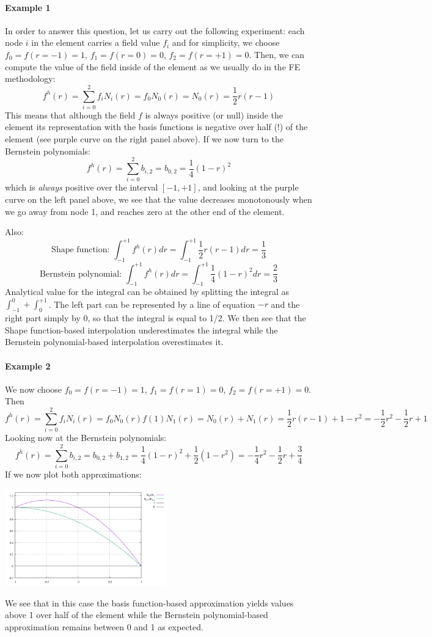 \paragraph{Example 1}
In order to answer this question, let us carry out the following 
experiment: each node $i$ in the element carries a field value $f_i$ and for simplicity, 
we choose $f_0=f(r=-1)=1$, $f_1=f(r=0)=0$, $f_2=f(r=+1)=0$.
Then, we can compute the value of the field inside of the element 
as we usually do in the FE methodology:
\[
f^h(r) = \sum_{i=0}^2 f_i N_i(r) = f_0 N_0(r) = N_0(r) = \frac{1}{2}r(r-1)
\]
This means that although the field $f$ is always positive (or null) inside the element
its representation with the basis functions is negative over half (!) of the element
(see purple curve on the right panel above).
If we now turn to the Bernstein polynomials:
\[
f^h(r) = \sum_{i=0}^2 b_{i,2} = b_{0,2} = \frac{1}{4}(1-r)^2
\]
which is {\it always} positive over the interval $[-1,+1]$, 
and looking at the purple curve on the left panel above, 
we see that the value decreases monotonously when we go away from node 1, and reaches 
zero at the other end of the element. 

Also:
\[
\text{Shape function: } \int_{-1}^{+1} f^h(r)dr = \int_{-1}^{+1} \frac{1}{2}r(r-1) dr = \frac{1}{3}  
\]
\[
\text{Bernstein polynomial: } \int_{-1}^{+1} f^h(r)dr =  \int_{-1}^{+1} \frac{1}{4}(1-r)^2 dr=  \frac{2}{3}  
\]
Analytical value for the integral can be obtained by splitting the integral as $\int_{-1}^0 + \int_0^{+1}$.
The left part can be represented by a line of equation $-r$ and the right part simply by 0, so that the 
integral is equal to 1/2. We then see that the Shape function-based interpolation underestimates
the integral while the Bernstein polynomial-based interpolation overestimates it.


\paragraph{Example 2}

We now choose $f_0=f(r=-1)=1$, $f_1=f(r=1)=0$, $f_2=f(r=+1)=0$. Then 
\[
f^h(r) = \sum_{i=0}^2 f_i N_i(r) = f_0 N_0(r) f(1) N_1(r) 
= N_0(r) + N_1(r) = \frac{1}{2}r(r-1) + 1-r^2 = -\frac{1}{2}r^2 -\frac{1}{2}r +1  
\]
Looking now at the Bernstein polynomials:
\[
f^h(r) = \sum_{i=0}^2 b_{i,2} = b_{0,2} + b_{1,2} = \frac{1}{4}(1-r)^2 + \frac{1}{2}(1-r^2)
= -\frac{1}{4}r^2-\frac{1}{2}r+\frac{3}{4}
\]
If we now plot both approximations:
\begin{center}
\includegraphics[width=7cm]{images/bernstein/N2__.pdf}
\end{center}
We see that in this case the basis function-based approximation yields values 
above 1 over half of the element while the Bernstein polynomial-based 
approximation remains between 0 and 1 as expected.

